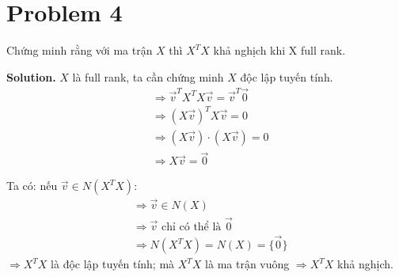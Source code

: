 \documentclass[a4paper, 12pt]{article}  %
\begin{document}
\section{Problem 4} 

Chứng minh rằng với ma trận $X$ thì $X^TX$ khả nghịch khi X full rank.

\textbf{Solution.} 
$X$ là full rank, ta cần chứng minh $X$ độc lập tuyến tính.\\
\begin{align*}
    &\Rightarrow \vec{v}^T X^T X \vec{v} = \vec{v}^T \overrightarrow{0} \\ &\Rightarrow(X \vec{v})^T X \vec{v} = 0 \\
    &\Rightarrow (X \vec{v}) \cdot(X \vec{v}) = 0 \\
    &\Rightarrow X \vec{v} = \overrightarrow{0}
\end{align*}

Ta có: nếu $\vec{v} \in N\left(X^T X\right): $
\begin{align*}
    &\Rightarrow \vec{v} \in N(X)\\
    & \Rightarrow \vec{v} \text  { chỉ có thể là }  \overrightarrow{0} \\
    & \Rightarrow N\left(X^T X\right)=N(X)=\{\overrightarrow{0}\}
\end{align*}
$\Rightarrow X^T X$ là độc lập tuyến tính; mà $X^T X$ là ma trận vuông $\Rightarrow X^T X$ khả nghịch. 
\end{document}

